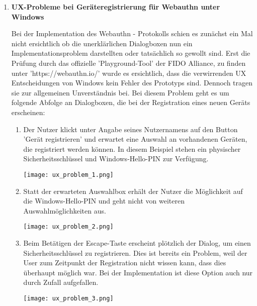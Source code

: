 \begin{enumerate}
\item \textbf{UX-Probleme bei Geräteregistrierung für Webauthn unter Windows}

Bei der Implementation des Webauthn - Protokolls schien es zunächst ein Mal nicht ersichtlich ob die unerklärlichen Dialogboxen nun ein Implementationsproblem darstellten oder tatsächlich so gewollt sind. Erst die Prüfung durch das offizielle 'Playground-Tool' der FIDO Alliance, zu finden unter 'https://webauthn.io/' wurde es ersichtlich, dass die verwirrenden UX Entscheidungen von Windows kein Fehler des Prototyps sind. Dennoch tragen sie zur allgemeinen Unverständnis bei.
Bei diesem Problem geht es um folgende Abfolge an Dialogboxen, die bei der Registration eines neuen Geräts erscheinen:
\newpage

\begin{enumerate}
\item Der Nutzer klickt unter Angabe seines Nutzernamens auf den Button 'Gerät registrieren' und erwartet eine Auswahl an vorhandenen Geräten, die registriert werden können. In diesem Beispiel stehen ein physischer Sicherheitsschlüssel und Windows-Hello-PIN zur Verfügung.

\begin{center}
    \center
    \texttt{[image: ux\_problem\_1.png]}
\end{center}

\item Statt der erwarteten Auswahlbox erhält der Nutzer die Möglichkeit auf die Windows-Hello-PIN und geht nicht von weiteren Auswahlmöglichkeiten aus.

\begin{center}
    \center
    \texttt{[image: ux\_problem\_2.png]}
\end{center}

\item Beim Betätigen der Escape-Taste erscheint plötzlich der Dialog, um einen Sicherheitsschlüssel zu registrieren. Dies ist bereits ein Problem, weil der User zum Zeitpunkt der Registration nicht wissen kann, dass dies überhaupt möglich war. Bei der Implementation ist diese Option auch nur durch Zufall aufgefallen.

\begin{center}
    \center
    \texttt{[image: ux\_problem\_3.png]}
\end{center}
\end{enumerate}


\end{enumerate}
